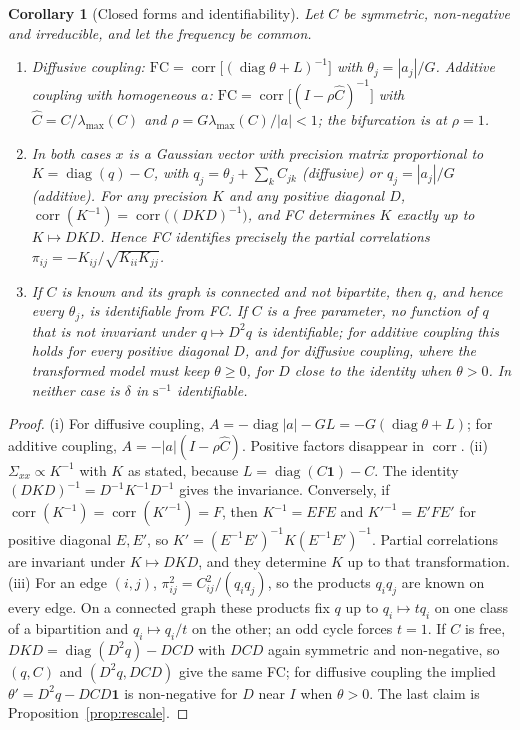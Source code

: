 \documentclass[aip,cha,reprint,amsmath,amssymb]{revtex4-2}
\newtheorem{corollary}[proposition]{Corollary}
\theoremstyle{remark}
\newcommand{\one}{\mathbf 1}
\newcommand{\corr}{\operatorname{corr}}
\newcommand{\diag}{\operatorname{diag}}
\newcommand{\FC}{\mathrm{FC}}
\begin{document}
\begin{corollary}[Closed forms and identifiability]\label{cor:closed}
Let $C$ be symmetric, non-negative and irreducible, and let the frequency be common.
\begin{enumerate}
  \item[(i)] Diffusive coupling: $\FC=\corr\bigl[(\diag\theta+L)^{-1}\bigr]$ with $\theta_j=|a_j|/G$. Additive coupling with homogeneous $a$: $\FC=\corr\bigl[(I-\rho\hat C)^{-1}\bigr]$ with $\hat C=C/\lambda_{\max}(C)$ and $\rho=G\lambda_{\max}(C)/|a|<1$; the bifurcation is at $\rho=1$.
  \item[(ii)] In both cases $x$ is a Gaussian vector with precision matrix proportional to $K=\diag(q)-C$, with $q_j=\theta_j+\sum_kC_{jk}$ (diffusive) or $q_j=|a_j|/G$ (additive). For any precision $K$ and any positive diagonal $D$, $\corr(K^{-1})=\corr\bigl((DKD)^{-1}\bigr)$, and FC determines $K$ exactly up to $K\mapsto DKD$. Hence FC identifies precisely the partial correlations $\pi_{ij}=-K_{ij}/\sqrt{K_{ii}K_{jj}}$.
  \item[(iii)] If $C$ is known and its graph is connected and not bipartite, then $q$, and hence every $\theta_j$, is identifiable from FC. If $C$ is a free parameter, no function of $q$ that is not invariant under $q\mapsto D^2q$ is identifiable; for additive coupling this holds for every positive diagonal $D$, and for diffusive coupling, where the transformed model must keep $\theta\ge0$, for $D$ close to the identity when $\theta>0$. In neither case is $\delta$ in $\mathrm{s}^{-1}$ identifiable.
\end{enumerate}
\end{corollary}

\begin{proof}
(i) For diffusive coupling, $A=-\diag|a|-GL=-G(\diag\theta+L)$; for additive coupling, $A=-|a|(I-\rho\hat C)$. Positive factors disappear in $\corr$.
(ii) $\Sigma_{xx}\propto K^{-1}$ with $K$ as stated, because $L=\diag(C\one)-C$. The identity $(DKD)^{-1}=D^{-1}K^{-1}D^{-1}$ gives the invariance. Conversely, if $\corr(K^{-1})=\corr(K'^{-1})=F$, then $K^{-1}=E F E$ and $K'^{-1}=E'FE'$ for positive diagonal $E,E'$, so $K'=(E^{-1}E')^{-1}K(E^{-1}E')^{-1}$. Partial correlations are invariant under $K\mapsto DKD$, and they determine $K$ up to that transformation.
(iii) For an edge $(i,j)$, $\pi_{ij}^2=C_{ij}^2/(q_iq_j)$, so the products $q_iq_j$ are known on every edge. On a connected graph these products fix $q$ up to $q_i\mapsto tq_i$ on one class of a bipartition and $q_i\mapsto q_i/t$ on the other; an odd cycle forces $t=1$. If $C$ is free, $DKD=\diag(D^2q)-DCD$ with $DCD$ again symmetric and non-negative, so $(q,C)$ and $(D^2q,DCD)$ give the same FC; for diffusive coupling the implied $\theta'=D^2q-DCD\one$ is non-negative for $D$ near $I$ when $\theta>0$. The last claim is Proposition~\ref{prop:rescale}.
\end{proof}
\end{document}
